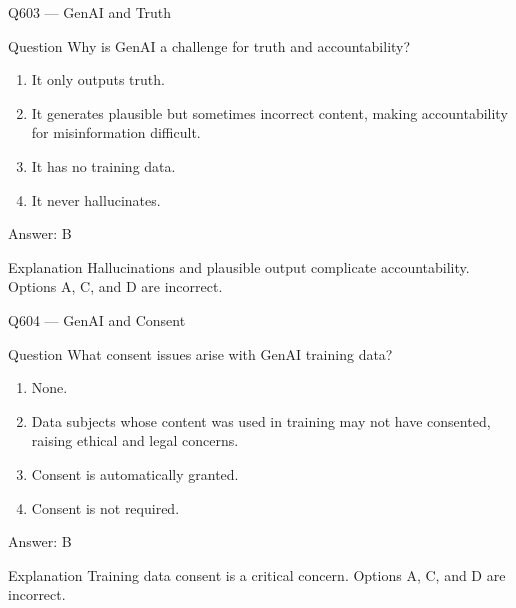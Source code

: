 \documentclass[aspectratio=169,8pt]{beamer}
\begin{document}
	\begin{frame}{Q603 --- GenAI and Truth}
		\begin{block}{Question}
			Why is GenAI a challenge for truth and accountability?
			\begin{enumerate}
				\item It only outputs truth.
				\item It generates plausible but sometimes incorrect content, making accountability for misinformation difficult.
				\item It has no training data.
				\item It never hallucinates.
			\end{enumerate}
		\end{block}
		\begin{exampleblock}{Answer: B}\end{exampleblock}
		\begin{block}{Explanation}
			Hallucinations and plausible output complicate accountability. Options A, C, and D are incorrect.
		\end{block}
	\end{frame}
	
	\begin{frame}{Q604 --- GenAI and Consent}
		\begin{block}{Question}
			What consent issues arise with GenAI training data?
			\begin{enumerate}
				\item None.
				\item Data subjects whose content was used in training may not have consented, raising ethical and legal concerns.
				\item Consent is automatically granted.
				\item Consent is not required.
			\end{enumerate}
		\end{block}
		\begin{exampleblock}{Answer: B}\end{exampleblock}
		\begin{block}{Explanation}
			Training data consent is a critical concern. Options A, C, and D are incorrect.
		\end{block}
	\end{frame}
	
\end{document}
